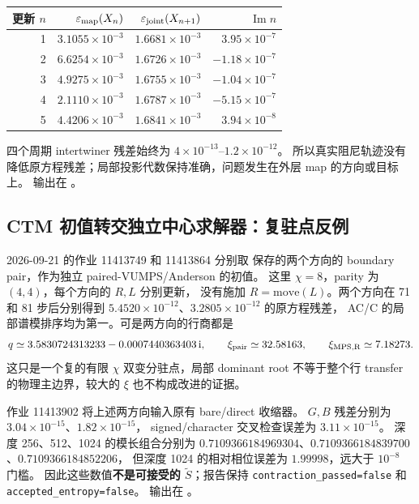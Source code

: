 \documentclass[11pt]{article}
\newcommand{\eps}{\varepsilon}
\newcommand{\tS}{\widetilde S}
\newcommand{\code}[1]{{\small\texttt{#1}}}
\begin{document}
\begin{center}\small
\begin{tabular}{rrrr}
\toprule
更新 $n$ & $\eps_{\rm map}(X_n)$ & $\eps_{\rm joint}(X_{n+1})$ & $\operatorname{Im} n$\\
\midrule
1 & $3.1055\times10^{-3}$ & $1.6681\times10^{-3}$ & $3.95\times10^{-7}$\\
2 & $6.6254\times10^{-3}$ & $1.6726\times10^{-3}$ & $-1.18\times10^{-7}$\\
3 & $4.9275\times10^{-3}$ & $1.6755\times10^{-3}$ & $-1.04\times10^{-7}$\\
4 & $2.1110\times10^{-3}$ & $1.6787\times10^{-3}$ & $-5.15\times10^{-7}$\\
5 & $4.4206\times10^{-3}$ & $1.6841\times10^{-3}$ & $3.94\times10^{-8}$\\
\bottomrule
\end{tabular}
\end{center}
四个周期 intertwiner 残差始终为 $4\times10^{-13}$--$1.2\times10^{-12}$。
所以真实阻尼轨迹没有降低原方程残差；局部投影代数保持准确，问题发生在外层 map 的方向或目标上。
输出在 。

\subsection{CTM 初值转交独立中心求解器：复驻点反例}
2026-09-21 的作业 11413749 和 11413864 分别取
保存的两个方向的 boundary pair，作为独立 paired-VUMPS/Anderson 的初值。
这里 $\chi=8$，parity 为 $(4,4)$，每个方向的 $R,L$ 分别更新，
没有施加 $R=\mathrm{move}(L)$。两个方向在 71 和 81 步后分别得到
$5.4520\times10^{-12}$、$3.2805\times10^{-12}$ 的原方程残差，
AC/C 的局部谱模排序均为第一。可是两方向的行商都是
\[
 q\simeq3.5830724313233-0.0007440363403\,\mathrm{i},
 \qquad\xi_{\rm pair}\simeq32.58163,
 \qquad\xi_{\rm MPS,R}\simeq7.18273.
\]
这只是一个复的有限 $\chi$ 双变分驻点，局部 dominant root
不等于整个行 transfer 的物理主边界，较大的 $\xi$ 也不构成改进的证据。

作业 11413902 将上述两方向输入原有 bare/direct 收缩器。
$G,B$ 残差分别为 $3.04\times10^{-15}$、$1.82\times10^{-15}$，
signed/character 交叉检查误差为 $3.11\times10^{-15}$。
深度 256、512、1024 的模长组合分别为
$0.7109366184969304$、$0.7109366184839700$、$0.7109366184852206$，
但深度 1024 的相对相位误差为 $1.99998$，远大于 $10^{-8}$ 门槛。
因此这些数值\textbf{不是可接受的 $\tS$}；报告保持
\code{contraction\_passed=false} 和 \code{accepted\_entropy=false}。
输出在 。
\end{document}
